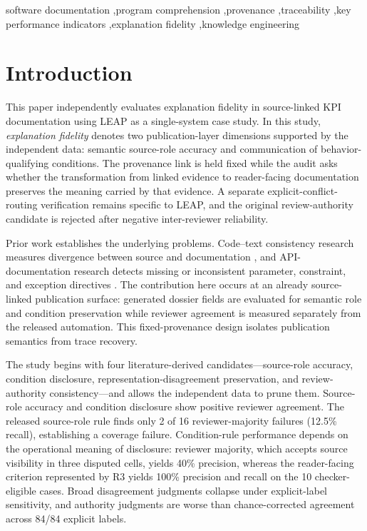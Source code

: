 \documentclass[a4paper,fleqn]{cas-dc}
\begin{document}
\begin{keywords}
software documentation \sep program comprehension \sep provenance \sep traceability \sep key performance indicators \sep explanation fidelity \sep knowledge engineering
\end{keywords}
\maketitle
{}

\section{Introduction}
This paper independently evaluates explanation fidelity in source-linked KPI documentation using LEAP as a single-system case study. In this study, \emph{explanation fidelity} denotes two publication-layer dimensions supported by the independent data: semantic source-role accuracy and communication of behavior-qualifying conditions. The provenance link is held fixed while the audit asks whether the transformation from linked evidence to reader-facing documentation preserves the meaning carried by that evidence. A separate explicit-conflict-routing verification remains specific to LEAP, and the original review-authority candidate is rejected after negative inter-reviewer reliability.

Prior work establishes the underlying problems. Code--text consistency research measures divergence between source and documentation \citep{Wen2019,Xu2024,Eghbali2026}, and API-documentation research detects missing or inconsistent parameter, constraint, and exception directives \citep{Zhou2017}. The contribution here occurs at an already source-linked publication surface: generated dossier fields are evaluated for semantic role and condition preservation while reviewer agreement is measured separately from the released automation. This fixed-provenance design isolates publication semantics from trace recovery.

The study begins with four literature-derived candidates---source-role accuracy, condition disclosure, representation-disagreement preservation, and review-authority consistency---and allows the independent data to prune them. Source-role accuracy and condition disclosure show positive reviewer agreement. The released source-role rule finds only 2 of 16 reviewer-majority failures (12.5\% recall), establishing a coverage failure. Condition-rule performance depends on the operational meaning of disclosure: reviewer majority, which accepts source visibility in three disputed cells, yields 40\% precision, whereas the reader-facing criterion represented by R3 yields 100\% precision and recall on the 10 checker-eligible cases. Broad disagreement judgments collapse under explicit-label sensitivity, and authority judgments are worse than chance-corrected agreement across 84/84 explicit labels.
\end{document}
